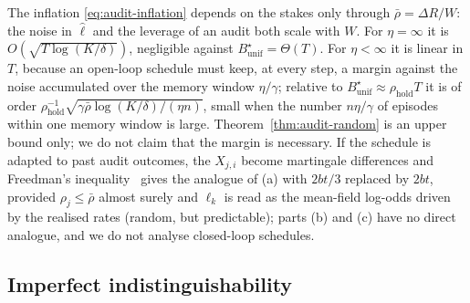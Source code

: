 \begin{remark}\label{rem:audit-random}
The inflation \eqref{eq:audit-inflation} depends on the stakes only through
$\bar\rho=\Delta R/W$: the noise in $\hat\ell$ and the leverage of an audit both
scale with $W$. For $\eta=\infty$ it is $O(\sqrt{T\log(K/\delta)})$, negligible
against $B^\star_{\mathrm{unif}}=\Theta(T)$. For $\eta<\infty$ it is linear in
$T$, because an open-loop schedule must keep, at every step, a margin against
the noise accumulated over the memory window $\eta/\gamma$; relative to
$B^\star_{\mathrm{unif}}\approx\rho_{\mathrm{hold}}T$ it is of order
$\rho_{\mathrm{hold}}^{-1}\sqrt{\gamma\bar\rho\log(K/\delta)/(\eta n)}$, small
when the number $n\eta/\gamma$ of episodes within one memory window is large.
Theorem~\ref{thm:audit-random} is an upper bound only; we do not claim that the
margin is necessary. If the schedule is adapted to past audit outcomes, the
$X_{j,i}$ become martingale differences and Freedman's
inequality~\cite{freedman1975tail} gives the analogue of (a) with $2bt/3$ replaced by $2bt$, provided $\rho_j\le\bar\rho$ almost surely and $\ell_k$ is read as the mean-field log-odds driven by the realised rates (random, but predictable); parts (b) and (c) have no direct analogue, and we do not analyse closed-loop schedules.
\end{remark}

\subsection{Imperfect indistinguishability}


